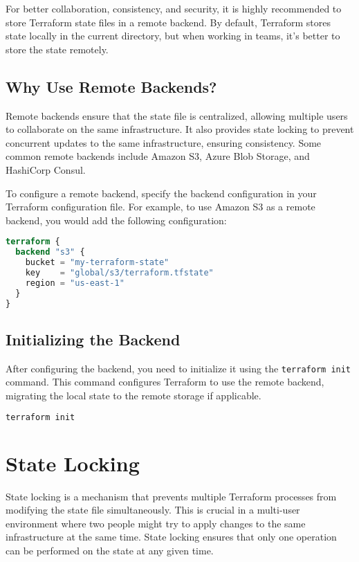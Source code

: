 For better collaboration, consistency, and security, it is highly recommended to store Terraform state files in a remote backend. By default, Terraform stores state locally in the current directory, but when working in teams, it's better to store the state remotely.

\subsection{Why Use Remote Backends?}

Remote backends ensure that the state file is centralized, allowing multiple users to collaborate on the same infrastructure. It also provides state locking to prevent concurrent updates to the same infrastructure, ensuring consistency. Some common remote backends include Amazon S3, Azure Blob Storage, and HashiCorp Consul.

To configure a remote backend, specify the backend configuration in your Terraform configuration file. For example, to use Amazon S3 as a remote backend, you would add the following configuration:

\begin{lstlisting}[language=terraform]
terraform {
  backend "s3" {
    bucket = "my-terraform-state"
    key    = "global/s3/terraform.tfstate"
    region = "us-east-1"
  }
}
\end{lstlisting}

\subsection{Initializing the Backend}

After configuring the backend, you need to initialize it using the \texttt{terraform init} command. This command configures Terraform to use the remote backend, migrating the local state to the remote storage if applicable.

\begin{lstlisting}[language=bash]
terraform init
\end{lstlisting}

\section{State Locking}

State locking is a mechanism that prevents multiple Terraform processes from modifying the state file simultaneously. This is crucial in a multi-user environment where two people might try to apply changes to the same infrastructure at the same time. State locking ensures that only one operation can be performed on the state at any given time.

